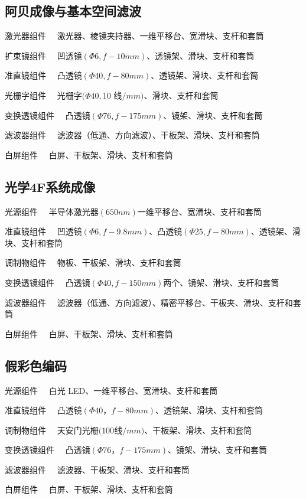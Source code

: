 \documentclass[12pt,a4paper]{article}
\begin{document}
    \subsection{阿贝成像与基本空间滤波}
    激光器组件 $\quad$激光器、棱镜夹持器、一维平移台、宽滑块、支杆和套筒\par
    扩束镜组件 $\quad$凹透镜$(\varPhi 6,f-10mm)$、透镜架、滑块、支杆和套筒\par
    准直镜组件 $\quad$凸透镜$(\varPhi 40,f-80mm)$、透镜架、滑块、支杆和套筒\par
    光栅字组件 $\quad$光栅字$(\varPhi 40,10$ 线$/mm)$、滑块、支杆和套筒\par
    变换透镜组件 $\quad$凸透镜$(\varPhi 76,f-175mm)$、镜架、滑块、支杆和套筒\par
    滤波器组件 $\quad$滤波器（低通、方向滤波）、干板架、滑块、支杆和套筒\par
    白屏组件 $\quad$白屏、干板架、滑块、支杆和套筒

    \subsection{光学4F系统成像}
    光源组件 $\quad$半导体激光器$(650nm)$一维平移台、宽滑块、支杆和套筒\par
    准直镜组件 $\quad$凹透镜$(\varPhi 6,f-9.8mm)$、凸透镜$(\varPhi 25,f-80mm)$、透镜架、滑块、支杆和套筒\par
    调制物组件 $\quad$物板、干板架、滑块、支杆和套筒\par
    变换透镜组件 $\quad$凸透镜$(\varPhi 40,f-150mm)$两个、镜架、滑块、支杆和套筒\par
    滤波器组件 $\quad$滤波器（低通、方向滤波）、精密平移台、干板夹、滑块、支杆和套筒\par
    白屏组件 $\quad$白屏、干板架、滑块、支杆和套筒

    \subsection{假彩色编码}
    光源组件 $\quad$白光 LED、一维平移台、宽滑块、支杆和套筒\par
    准直镜组件 $\quad$凸透镜$(\varPhi 40，f-80mm)$、透镜架、滑块、支杆和套筒\par
    调制物组件 $\quad$天安门光栅$(100 $线$/mm)$、干板架、滑块、支杆和套筒\par
    变换透镜组件 $\quad$凸透镜$(\varPhi 76，f-175mm)$、镜架、滑块、支杆和套筒\par
    滤波器组件 $\quad$滤波器、干板架、滑块、支杆和套筒\par
    白屏组件 $\quad$白屏、干板架、滑块、支杆和套筒
\end{document}
